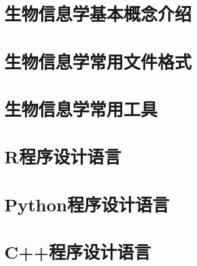 \documentclass[14pt]{book}
\title{\mydocumentTitle}
\author{\mydocumentAuthor}
\newcommand{\cpp}{C++}
\begin{document}
	
\frontmatter

\maketitle

\tableofcontents

\mainmatter


\part{生物信息学基本概念介绍}

\part{生物信息学常用文件格式}

\part{生物信息学常用工具}


\part{R程序设计语言}









\part{Python程序设计语言}









\part{\cpp 程序设计语言}



%
%
%
%
%
%
%
%
%
%
%
%
%
%
%
%
%


\appendix


\backmatter



\printindex %
\end{document}
